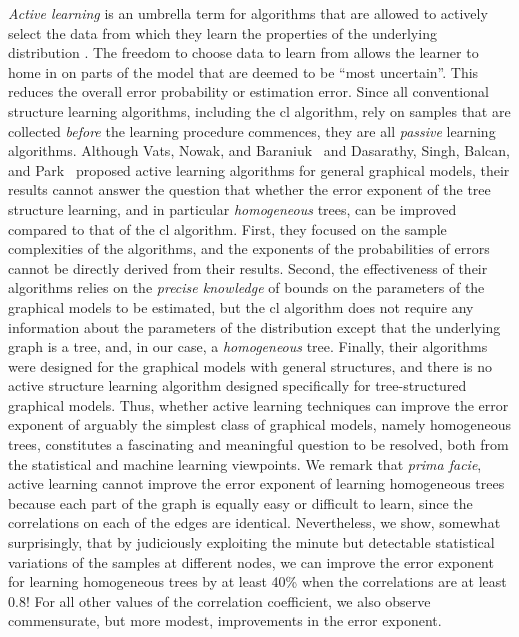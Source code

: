 \documentclass[11pt,onecolumn]{article}
\begin{document}
{\em Active learning} is an umbrella term for   algorithms that are allowed to actively select  the data from which they learn the properties of the underlying distribution \cite{settles2009active}. The freedom to choose  data to learn from allows the learner to home in on parts of the model that are deemed to be ``most uncertain''. This    reduces the overall error probability or estimation error. Since all   conventional structure learning algorithms, including the \ac{cl} algorithm, rely on   samples that are collected {\em before} the  learning procedure commences, they are all \emph{passive} learning algorithms. Although Vats, Nowak, and Baraniuk~\cite{vats2014active} and Dasarathy, Singh, Balcan, and Park~\cite{dasarathy2016active} proposed active learning algorithms for general graphical models, their results cannot answer the question that whether the error exponent of the tree structure learning, and in particular {\em homogeneous} trees, can be improved compared to that of the \ac{cl} algorithm. First, they focused on the sample complexities of the algorithms, and the exponents of the probabilities of errors  cannot be directly derived from their results. Second, the effectiveness of their algorithms relies on the {\em precise knowledge} of bounds on the parameters of the graphical models to be estimated, but the \ac{cl} algorithm does not require any information about the parameters of the distribution except that the underlying graph is a tree, and, in our case, a {\em homogeneous} tree. Finally, their algorithms were designed  for the graphical models with general structures, and there is no active structure learning algorithm designed specifically for tree-structured graphical models. Thus, whether active learning techniques can improve the error exponent of arguably the simplest class of graphical models, namely homogeneous trees, constitutes a fascinating and meaningful question to be resolved, both from the statistical and machine learning viewpoints. We remark that {\em prima facie}, active learning cannot improve the error exponent of learning homogeneous trees because each part of the graph is equally easy or difficult to learn, since the correlations on each of the edges are identical. Nevertheless, we show, somewhat  surprisingly, that by judiciously exploiting the minute but detectable statistical variations of the samples at different nodes, we can improve the error exponent for learning homogeneous trees by at least 40\% when the correlations are at least $0.8$! For all other values of the correlation coefficient, we also observe commensurate, but more modest, improvements in the error exponent.  %
\end{document}

